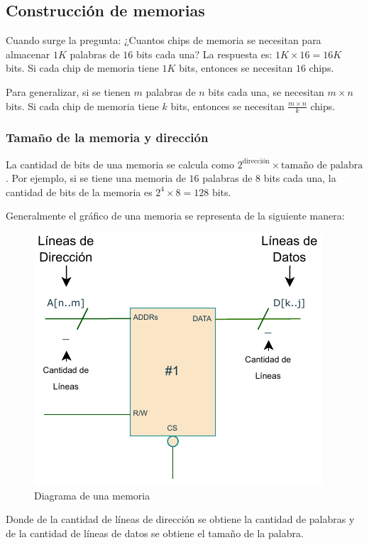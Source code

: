 \subsection{Construcción de memorias}
Cuando surge la pregunta: ¿Cuantos chips de memoria se necesitan para almacenar $1K$ palabras de $16$ bits cada una? La respuesta es: $1K \times 16 = 16K$ bits. Si cada chip de memoria tiene $1K$ bits, entonces se necesitan $16$ chips.

\begin{mdframed}[backgroundcolor=gray!10,linewidth=0]
    Para generalizar, si se tienen $m$ palabras de $n$ bits cada una, se necesitan $m \times n$ bits. Si cada chip de memoria tiene $k$ bits, entonces se necesitan $\frac{m \times n}{k}$ chips.
\end{mdframed}

\newpage
\subsubsection{Tamaño de la memoria y dirección}
La cantidad de bits de una memoria se calcula como $2^{\text{dirección}} \times \text{tamaño de palabra}$. Por ejemplo, si se tiene una memoria de $16$ palabras de $8$ bits cada una, la cantidad de bits de la memoria es $2^4 \times 8 = 128$ bits. 

Generalmente el gráfico de una memoria se representa de la siguiente manera:

\begin{figure}[h]
    \centering
    \includegraphics[scale=1]{img/diagramamem.pdf}
    \caption{Diagrama de una memoria}
\end{figure}
Donde de la cantidad de líneas de dirección se obtiene la cantidad de palabras y de la cantidad de líneas de datos se obtiene el tamaño de la palabra.
